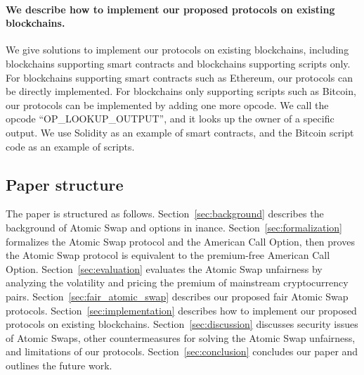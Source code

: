 \paragraph{We describe how to implement our proposed protocols on existing blockchains.}
We give solutions to implement our protocols on existing blockchains, including blockchains supporting smart contracts and blockchains supporting scripts only.
For blockchains supporting smart contracts such as Ethereum, our protocols can be directly implemented.
For blockchains only supporting scripts such as Bitcoin, our protocols can be implemented by adding one more opcode.
We call the opcode ``OP\_LOOKUP\_OUTPUT'', and it looks up the owner of a specific output.
We use Solidity as an example of smart contracts, and the Bitcoin script code as an example of scripts.

\subsection{Paper structure}

The paper is structured as follows.
Section~\ref{sec:background} describes the background of Atomic Swap and options in inance.
Section~\ref{sec:formalization} formalizes the Atomic Swap protocol and the American Call Option, then proves the Atomic Swap protocol is equivalent to the premium-free American Call Option.
Section~\ref{sec:evaluation} evaluates the Atomic Swap unfairness by analyzing the volatility and pricing the premium of mainstream cryptocurrency pairs.
Section~\ref{sec:fair_atomic_swap} describes our proposed fair Atomic Swap protocols.
Section~\ref{sec:implementation} describes how to implement our proposed protocols on existing blockchains.
Section~\ref{sec:discussion} discusses security issues of Atomic Swaps, other countermeasures for solving the Atomic Swap unfairness, and limitations of our protocols.
Section~\ref{sec:conclusion} concludes our paper and outlines the future work.
